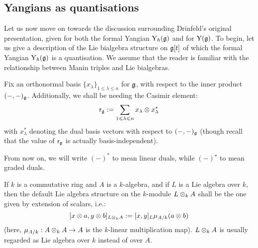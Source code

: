     \subsection{Yangians as quantisations}
        Let us now move on towards the discussion surrounding Drinfeld's original presentation, given for both the formal Yangian $\mathrm{Y}_{\hbar}(\mathfrak{g})$ and for $\mathrm{Y}(\mathfrak{g})$. To begin, let us give a description of the Lie bialgebra structure on $\mathfrak{g}[t]$ of which the formal Yangian $\mathrm{Y}_{\hbar}(\mathfrak{g})$ is a quantisation. We assume that the reader is familiar with the relationship between Manin triples and Lie bialgebras.

        \begin{convention}
            Fix an orthonormal basis $\{x_{\lambda}\}_{1 \leq \lambda \leq n}$ for $\mathfrak{g}$, with respect to the inner product $(-, -)_{\mathfrak{g}}$. Additionally, we shall be needing the Casimir element:
                $$\sfr_{\g} := \sum_{1 \leq \lambda \leq n} x_{\lambda} \tensor x_{\lambda}^*$$
            with $x_{\lambda}^*$ denoting the dual basis vectors with respect to $(-, -)_{\mathfrak{g}}$ (though recall that the value of $\mathsf{r}_{\mathfrak{g}}$ is actually basis-independent).
        \end{convention}
        \begin{convention}
            From now on, we will write $(-)^*$ to mean linear duals, while $(-)^{\star}$ to mean graded duals. 
        \end{convention}
        \begin{convention}
            If $k$ is a commutative ring and $A$ is a $k$-algebra, and if $L$ is a Lie algebra over $k$, then the default Lie algebra structure on the $k$-module $L \tensor_k A$ shall be the one given by extension of scalars, i.e.:
                $$[x \tensor a, y \tensor b]_{L \tensor_k A} := [x, y]_L \mu_{A/k}(a \tensor b)$$
            (here, $\mu_{A/k}: A \tensor_k A \to A$ is the $k$-linear multiplication map). $L \tensor_k A$ is usually regarded as Lie algebra over $k$ instead of over $A$.  
        \end{convention}
        

